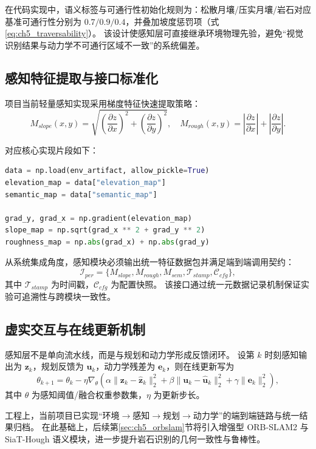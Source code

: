 在代码实现中，语义标签与可通行性初始化规则为：松散月壤/压实月壤/岩石对应基准可通行性分别为 $0.7/0.9/0.4$，并叠加坡度惩罚项（式\eqref{eq:ch5_traversability}）。
该设计使感知层可直接继承环境物理先验，避免“视觉识别结果与动力学不可通行区域不一致”的系统偏差。

\subsection{感知特征提取与接口标准化}

项目当前轻量感知实现采用梯度特征快速提取策略：
\begin{equation}
M_{slope}(x,y)=\sqrt{\left(\frac{\partial z}{\partial x}\right)^2+\left(\frac{\partial z}{\partial y}\right)^2},
\quad
M_{rough}(x,y)=\left|\frac{\partial z}{\partial x}\right|+\left|\frac{\partial z}{\partial y}\right|.
\label{eq:ch5_slope_roughness}
\end{equation}

对应核心实现片段如下：
\begin{lstlisting}[language=Python,caption={感知特征提取核心代码片段},label={lst:ch5_perception_pipeline}]
data = np.load(env_artifact, allow_pickle=True)
elevation_map = data["elevation_map"]
semantic_map = data["semantic_map"]

grad_y, grad_x = np.gradient(elevation_map)
slope_map = np.sqrt(grad_x ** 2 + grad_y ** 2)
roughness_map = np.abs(grad_x) + np.abs(grad_y)
\end{lstlisting}

从系统集成角度，感知模块必须输出统一特征数据包并满足端到端调用契约：
\begin{equation}
\mathcal{I}_{per}=\{M_{slope},M_{rough},M_{sem},\mathcal{T}_{stamp},\mathcal{C}_{cfg}\},
\label{eq:ch5_perception_interface}
\end{equation}
其中 $\mathcal{T}_{stamp}$ 为时间戳，$\mathcal{C}_{cfg}$ 为配置快照。
该接口通过统一元数据记录机制保证实验可追溯性与跨模块一致性。

\subsection{虚实交互与在线更新机制}

感知层不是单向流水线，而是与规划和动力学形成反馈闭环。
设第 $k$ 时刻感知输出为 $\mathbf{z}_k$，规划反馈为 $\mathbf{u}_k$，动力学残差为 $\mathbf{e}_k$，则在线更新写为
\begin{equation}
\theta_{k+1}=\theta_k-\eta\nabla_{\theta}
\left(
\alpha\|\mathbf{z}_k-\hat{\mathbf{z}}_k\|_2^2+
\beta\|\mathbf{u}_k-\hat{\mathbf{u}}_k\|_2^2+
\gamma\|\mathbf{e}_k\|_2^2
\right),
\label{eq:ch5_online_update}
\end{equation}
其中 $\theta$ 为感知阈值/融合权重参数集，$\eta$ 为更新步长。

工程上，当前项目已实现“环境$\rightarrow$感知$\rightarrow$规划$\rightarrow$动力学”的端到端链路与统一结果归档。
在此基础上，后续第\ref{sec:ch5_orbslam}节将引入增强型 ORB-SLAM2 与 SiaT-Hough 语义模块，进一步提升岩石识别的几何一致性与鲁棒性。
